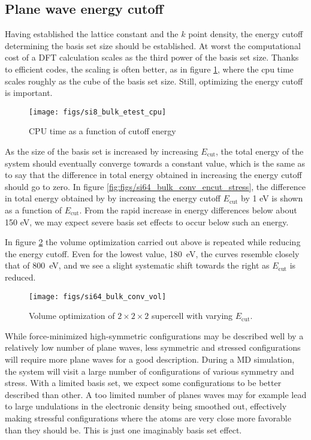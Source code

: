 \documentclass[11pt]{scrbook}   %
\begin{document}
\subsection{Plane wave energy cutoff}

Having established the lattice constant and the $k$ point density, the energy cutoff determining the basis set size
should be established.
At worst the computational cost of a DFT calculation scales as the third power of the basis set size. 
Thanks to efficient codes, the scaling is often better, as in figure \ref{fig:si_bulk_conv_e_cpu}, where the 
cpu time scales roughly as the cube of the basis set size. Still, optimizing the energy cutoff is important.

\begin{figure}[htbp]
  \begin{center}
    \texttt{[image: figs/si8\_bulk\_etest\_cpu]}
  \end{center}
  \caption{CPU time as a function of cutoff energy}
  \label{fig:si_bulk_conv_e_cpu}
\end{figure}

As the size of the basis set is increased by increasing $E_{\text{cut}}$,
the total energy of the system should eventually converge towards a constant value, 
which is the same as to say that the difference in total energy obtained in increasing the energy cutoff should go to zero.
In figure \ref{fig:figs/si64_bulk_conv_encut_stress}, the difference 
in total energy obtained by by increasing the energy cutoff $E_{\text{cut}}$ by 1 eV is shown as a function of $E_{\text{cut}}$.
From the rapid increase in energy differences below about 150 eV, we may expect severe basis set effects to occur below such an energy.

In figure \ref{fig:figs/si64_bulk_conv_vol} the volume optimization carried out above is repeated while reducing the 
energy cutoff. Even for the lowest value, \SI{180}{\electronvolt}, the curves resemble closely that of \SI{800}{\electronvolt},
and we see a slight systematic shift towards the right as $E_{\text{cut}}$ is reduced.
\begin{figure}[htbp]
  \begin{center}
    \texttt{[image: figs/si64\_bulk\_conv\_vol]}
  \end{center}
  \caption{
  Volume optimization of $2\times2\times2$ supercell with varying $E_{\text{cut}}$.
  }
  \label{fig:figs/si64_bulk_conv_vol}
\end{figure}

While force-minimized high-symmetric configurations may be described well by a relatively low number of plane waves, 
less symmetric and stressed configurations will require more plane waves for a good description. 
During a MD simulation, the system will visit a large number of configurations of various symmetry and stress. 
With a limited basis set, we expect some configurations to be better described than other. 
A too limited number of planes waves may for example lead to large undulations in the electronic density being smoothed out, 
effectively making stressful configurations where the atoms are very close more favorable than they should be. 
This is just one imaginably basis set effect.
\end{document}
